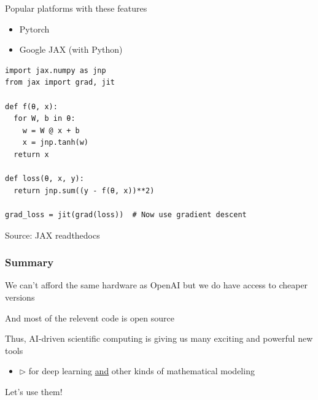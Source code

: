 \documentclass[
    xcolor={svgnames,dvipsnames},
    hyperref={colorlinks, citecolor=DeepPink4, linkcolor=DarkRed, urlcolor=DarkBlue}
    ]{beamer}  %
\newcommand{\1}{\mathbbm 1}
\begin{document}
\begin{frame}
    
    Popular platforms with these features

    \vspace{0.5em}
    \begin{itemize}
        \item Pytorch
        \vspace{0.5em}
        \item Google JAX (with Python)
    \end{itemize}


\end{frame}



\begin{frame}[fragile]
    
    \vspace{-1em}
    \begin{verbatim}
import jax.numpy as jnp
from jax import grad, jit

def f(θ, x):
  for W, b in θ:
    w = W @ x + b
    x = jnp.tanh(w)  
  return x

def loss(θ, x, y):
  return jnp.sum((y - f(θ, x))**2)

grad_loss = jit(grad(loss))  # Now use gradient descent 
    \end{verbatim}

    {\footnotesize Source: JAX readthedocs}

\end{frame}


\begin{frame}
    \frametitle{Summary}

    We can't afford the same hardware as OpenAI but we do have access to cheaper
    versions

    \vspace{0.5em}
    And most of the relevent code is open source

    \vspace{0.5em}
    Thus, AI-driven scientific computing is giving us many exciting and
    powerful new tools

    \vspace{0.5em}
    \begin{itemize}
        \item $\triangleright$ for deep learning \underline{and} other kinds of
            mathematical modeling
    \end{itemize}

    \vspace{0.5em}
    \vspace{0.5em}

    Let's use them!

\end{frame}
\end{document}
